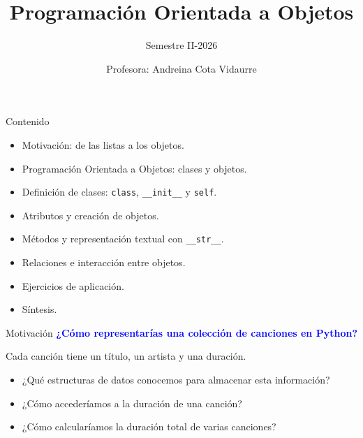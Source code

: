 \documentclass{beamer}
\title{Programación Orientada a Objetos}
\subtitle{Semestre II-2026}
\author{Profesora: Andreina Cota Vidaurre}
\begin{document}
  \shorthandoff{-}
  \frame[c]{\maketitle}

    \begin{frame}{Contenido}
        \begin{itemize}
            \item Motivación: de las listas a los objetos.
            \item Programación Orientada a Objetos: clases y objetos.
            \item Definición de clases: \texttt{class}, \texttt{__init__} y \texttt{self}.
            \item Atributos y creación de objetos.
            \item Métodos y representación textual con \texttt{__str__}.
            \item Relaciones e interacción entre objetos.
            \item Ejercicios de aplicación.
            \item Síntesis.
        \end{itemize}
    \end{frame}
    
    \begin{frame}{Motivación}
        \textcolor{blue}{\textbf{¿Cómo representarías una colección de canciones en Python?}}
    
        \vspace{1em}
        Cada canción tiene un título, un artista y una duración.
    
        \vspace{1em}
        \begin{itemize}
            \item ¿Qué estructuras de datos conocemos para almacenar esta información?
            \pause
            \item ¿Cómo accederíamos a la duración de una canción?
            \pause
            \item ¿Cómo calcularíamos la duración total de varias canciones?
        \end{itemize}
    \end{frame}
    
\end{document}
